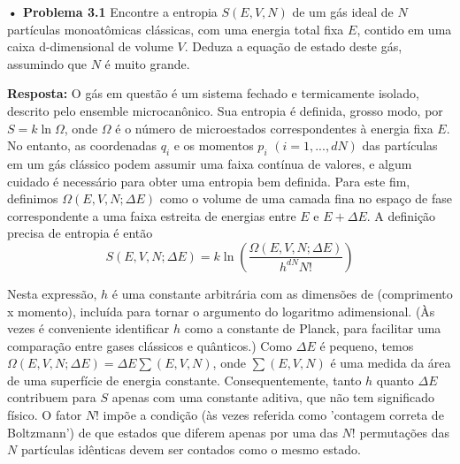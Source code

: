 \documentclass[12pt]{article}
\begin{document}
\textbf{• Problema 3.1} Encontre a entropia $S(E, V, N)$ de um gás ideal de $N$ partículas monoatômicas clássicas, com uma energia total fixa $E$, contido em uma caixa d-dimensional de volume $V$. Deduza a equação de estado deste gás, assumindo que $N$ é muito grande.

\textbf{Resposta:} O gás em questão é um sistema fechado e termicamente isolado, descrito pelo ensemble microcanônico. Sua entropia é definida, grosso modo, por $S = k \ln \Omega$, onde $\Omega$ é o número de microestados correspondentes à energia fixa $E$. No entanto, as coordenadas $q_i$ e os momentos $p_i$ $(i = 1, ..., dN)$ das partículas em um gás clássico podem assumir uma faixa contínua de valores, e algum cuidado é necessário para obter uma entropia bem definida. Para este fim, definimos $\Omega (E, V, N; \Delta E)$ como o volume de uma camada fina no espaço de fase correspondente a uma faixa estreita de energias entre $E$ e $E + \Delta E$. A definição precisa de entropia é então 
\[
S(E, V, N; \Delta E) = k \ln \left( \frac{\Omega(E, V, N; \Delta E)}{h^{dN} N!} \right)
\]

Nesta expressão, $h$ é uma constante arbitrária com as dimensões de (comprimento x momento), incluída para tornar o argumento do logaritmo adimensional. (Às vezes é conveniente identificar $h$ como a constante de Planck, para facilitar uma comparação entre gases clássicos e quânticos.) Como $\Delta E$ é pequeno, temos $\Omega (E, V, N; \Delta E) = \Delta E \sum (E, V, N)$, onde $\sum (E, V, N)$ é uma medida da área de uma superfície de energia constante. Consequentemente, tanto $h$ quanto $\Delta E$ contribuem para $S$ apenas com uma constante aditiva, que não tem significado físico. O fator $N!$ impõe a condição (às vezes referida como 'contagem correta de Boltzmann') de que estados que diferem apenas por uma das $N!$ permutações das $N$ partículas idênticas devem ser contados como o mesmo estado.
\end{document}
